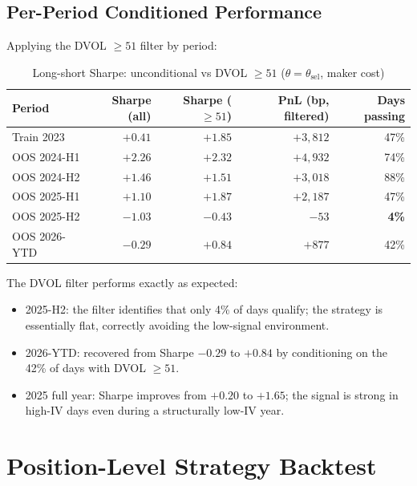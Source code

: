 \documentclass[12pt, a4paper]{article}
\theoremstyle{plain}
\theoremstyle{definition}
\begin{document}
\subsection{Per-Period Conditioned Performance}

Applying the DVOL $\geq 51$ filter by period:

\begin{table}[H]
\centering
\caption{Long-short Sharpe: unconditional vs DVOL $\geq 51$
($\theta=\theta_\mathrm{sel}$, maker cost)}
\label{tab:dvol_cond}
\begin{tabular}{lrrrr}
\toprule
Period & Sharpe (all) & Sharpe ($\geq 51$) & PnL (bp, filtered) & Days passing \\
\midrule
Train 2023   & $+0.41$ & $+1.85$ & $+3{,}812$ & 47\% \\
OOS 2024-H1  & $+2.26$ & $+2.32$ & $+4{,}932$ & 74\% \\
OOS 2024-H2  & $+1.46$ & $+1.51$ & $+3{,}018$ & 88\% \\
OOS 2025-H1  & $+1.10$ & $+1.87$ & $+2{,}187$ & 47\% \\
OOS 2025-H2  & $-1.03$ & $-0.43$ & $-53$       & \textbf{4\%}  \\
OOS 2026-YTD & $-0.29$ & $+0.84$ & $+877$      & 42\% \\
\bottomrule
\end{tabular}
\end{table}

The DVOL filter performs exactly as expected:
\begin{itemize}[noitemsep]
  \item 2025-H2: the filter identifies that only 4\% of days qualify;
        the strategy is essentially flat, correctly avoiding the
        low-signal environment.
  \item 2026-YTD: recovered from Sharpe $-0.29$ to $+0.84$ by
        conditioning on the 42\% of days with DVOL $\geq 51$.
  \item 2025 full year: Sharpe improves from $+0.20$ to $+1.65$; the
        signal is strong in high-IV days even during a structurally
        low-IV year.
\end{itemize}


\section{Position-Level Strategy Backtest}
\label{sec:backtest}
\end{document}
